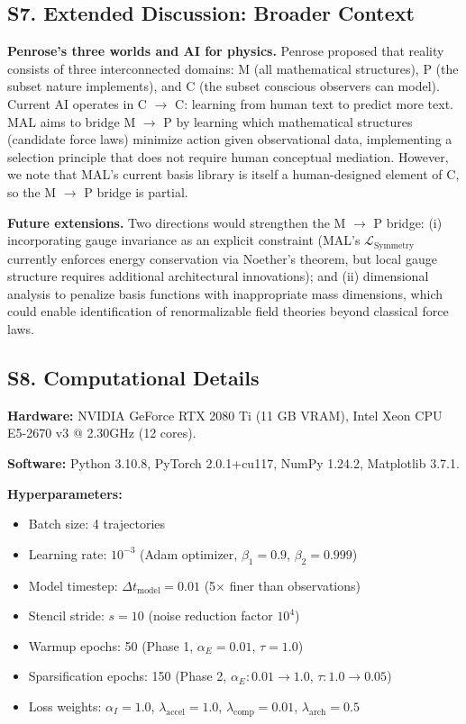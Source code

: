 \documentclass[9pt,twocolumn,twoside]{pnas-new}
\begin{document}
\subsection*{S7. Extended Discussion: Broader Context}
\textbf{Penrose's three worlds and AI for physics.} Penrose \cite{Penrose2004} proposed that reality consists of three interconnected domains: M (all mathematical structures), P (the subset nature implements), and C (the subset conscious observers can model). Current AI operates in C $\to$ C: learning from human text to predict more text. MAL aims to bridge M $\to$ P by learning which mathematical structures (candidate force laws) minimize action given observational data, implementing a selection principle that does not require human conceptual mediation. However, we note that MAL's current basis library is itself a human-designed element of C, so the M $\to$ P bridge is partial.

\textbf{Future extensions.} Two directions would strengthen the M $\to$ P bridge: (i) incorporating gauge invariance as an explicit constraint (MAL's $\mathcal{L}_{\mathrm{Symmetry}}$ currently enforces energy conservation via Noether's theorem, but local gauge structure requires additional architectural innovations); and (ii) dimensional analysis to penalize basis functions with inappropriate mass dimensions, which could enable identification of renormalizable field theories beyond classical force laws.

\subsection*{S8. Computational Details}
\textbf{Hardware:} NVIDIA GeForce RTX 2080 Ti (11 GB VRAM), Intel Xeon CPU E5-2670 v3 @ 2.30GHz (12 cores).

\textbf{Software:} Python 3.10.8, PyTorch 2.0.1+cu117, NumPy 1.24.2, Matplotlib 3.7.1.

\textbf{Hyperparameters:}
\begin{itemize}
\item Batch size: 4 trajectories
\item Learning rate: $10^{-3}$ (Adam optimizer, $\beta_1 = 0.9$, $\beta_2 = 0.999$)
\item Model timestep: $\Delta t_{\text{model}} = 0.01$ (5$\times$ finer than observations)
\item Stencil stride: $s = 10$ (noise reduction factor $10^4$)
\item Warmup epochs: 50 (Phase 1, $\alpha_E = 0.01$, $\tau = 1.0$)
\item Sparsification epochs: 150 (Phase 2, $\alpha_E: 0.01 \to 1.0$, $\tau: 1.0 \to 0.05$)
\item Loss weights: $\alpha_I = 1.0$, $\lambda_{\text{accel}} = 1.0$, $\lambda_{\text{comp}} = 0.01$, $\lambda_{\text{arch}} = 0.5$
\end{itemize}
\end{document}
